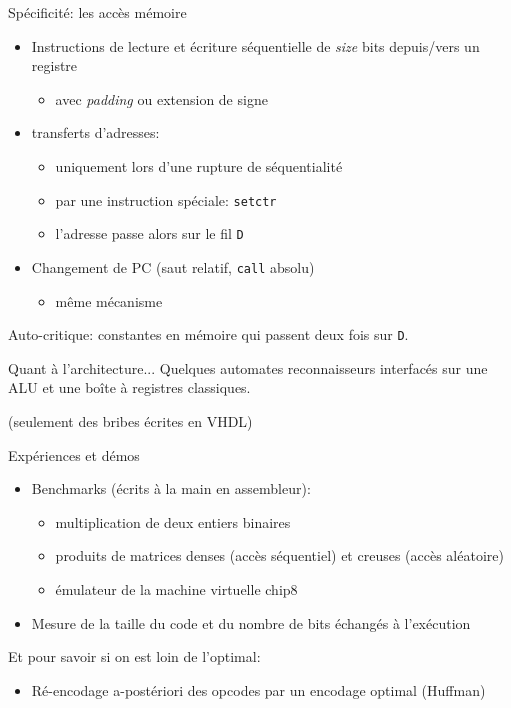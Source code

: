 \documentclass[slidetop,11pt,table]{beamer}
\begin{document}
\begin{frame}{Spécificité: les accès mémoire}
  \begin{itemize}
  \item Instructions de lecture et écriture séquentielle de
    \emph{size} bits depuis/vers un registre
  \begin{itemize}
  \item avec \emph{padding} ou extension de signe
  \end{itemize}
  
\item transferts d'adresses:
  \begin{itemize}
  \item uniquement lors d'une rupture de séquentialité
  \item par une instruction spéciale: \texttt{setctr}
  \item l'adresse passe alors sur le fil \texttt{D} 
  \end{itemize}
\item Changement de PC (saut relatif, \texttt{call} absolu)
  \begin{itemize}
  \item même mécanisme
  \end{itemize}
\end{itemize}
Auto-critique: constantes en mémoire qui passent deux fois sur \texttt{D}.
\end{frame}



\begin{frame}{Quant à l'architecture...}
  Quelques automates reconnaisseurs interfacés sur une ALU et une boîte à registres classiques. 
  
  (seulement des bribes écrites en VHDL)

\end{frame}



\begin{frame}{Expériences et démos}
  \begin{itemize}
  \item Benchmarks (écrits à la main en assembleur):
    \begin{itemize}
    \item multiplication de deux entiers binaires
    \item produits de matrices denses (accès séquentiel) et creuses (accès aléatoire)
    \item émulateur de la machine virtuelle chip8
    \end{itemize}
  \item Mesure de la taille du code et du nombre de bits échangés à l'exécution
  \end{itemize}

  Et pour savoir si on est loin de l'optimal:
  \begin{itemize}
  \item Ré-encodage a-postériori des opcodes par un encodage
    optimal (Huffman)
  \end{itemize}

\end{frame}
\end{document}
